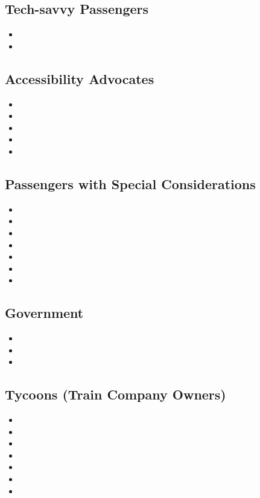 \subsection{Tech-savvy Passengers}
\begin{itemize}
    \item \userStoryFour
    \item \userStoryFive
\end{itemize}

\subsection{Accessibility Advocates}
\begin{itemize}
    \item \userStorySix
    \item \userStorySeven
    \item \userStoryEight
    \item \userStoryNine
    \item \userStoryTen
\end{itemize}

\subsection{Passengers with Special Considerations}
\begin{itemize}
    \item \userStoryEleven
    \item \userStoryTwelve
    \item \userStoryThirteen
    \item \userStoryFourteen
    \item \userStoryFifteen
    \item \userStorySixteen
    \item \userStorySeventeen
\end{itemize}

\subsection{Government}
\begin{itemize}
    \item \userStoryEighteen
    \item \userStoryNineteen
    \item \userStoryTwenty
\end{itemize}

\subsection{Tycoons (Train Company Owners)}
\begin{itemize}
    \item \userStoryTwentyOne
    \item \userStoryTwentyTwo
    \item \userStoryTwentyThree
    \item \userStoryTwentyFour
    \item \userStoryThirtyFive
    \item \userStoryThirtyEight
    \item \userStoryForty
\end{itemize}

